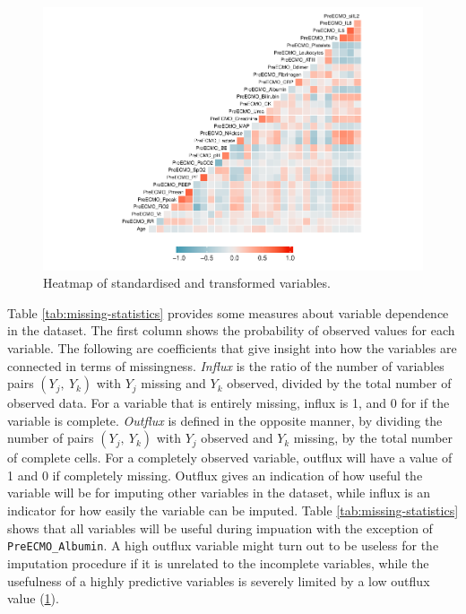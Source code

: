 \documentclass[12pt,]{article}
\begin{document}
\begin{figure}[H]

{\centering \includegraphics[width=1\linewidth]{figure/graphics-unnamed-chunk-10-1} 

}

\caption{\label{fig:heatmap-standardised}Heatmap of standardised and transformed variables.}\label{fig:unnamed-chunk-10}
\end{figure}

Table \ref{tab:missing-statistics} provides some measures about variable
dependence in the dataset. The first column shows the probability of
observed values for each variable. The following are coefficients that
give insight into how the variables are connected in terms of
missingness. \emph{Influx} is the ratio of the number of variables pairs
\((Y_j, ~Y_k)\) with \(Y_j\) missing and \(Y_k\) observed, divided by
the total number of observed data. For a variable that is entirely
missing, influx is 1, and 0 for if the variable is complete.
\emph{Outflux} is defined in the opposite manner, by dividing the number
of pairs \((Y_j, ~Y_k)\) with \(Y_j\) observed and \(Y_k\) missing, by
the total number of complete cells. For a completely observed variable,
outflux will have a value of 1 and 0 if completely missing. Outflux
gives an indication of how useful the variable will be for imputing
other variables in the dataset, while influx is an indicator for how
easily the variable can be imputed. Table \ref{tab:missing-statistics}
shows that all variables will be useful during impuation with the
exception of \texttt{PreECMO\_Albumin}. A high outflux variable might
turn out to be useless for the imputation procedure if it is unrelated
to the incomplete variables, while the usefulness of a highly predictive
variables is severely limited by a low outflux value
(\protect\hyperlink{ref-van_buuren_flexible_2012}{1}).
\end{document}
